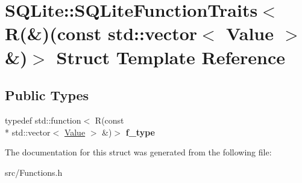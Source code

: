 \hypertarget{struct_s_q_lite_1_1_s_q_lite_function_traits_3_01_r_07_6_08_07const_01std_1_1vector_3_01_value_01_4_01_6_08_4}{\section{S\-Q\-Lite\-:\-:S\-Q\-Lite\-Function\-Traits$<$ R(\&)(const std\-:\-:vector$<$ Value $>$ \&)$>$ Struct Template Reference}
\label{struct_s_q_lite_1_1_s_q_lite_function_traits_3_01_r_07_6_08_07const_01std_1_1vector_3_01_value_01_4_01_6_08_4}
}
\subsection*{Public Types}
\begin{DoxyCompactItemize}
\item 
\hypertarget{struct_s_q_lite_1_1_s_q_lite_function_traits_3_01_r_07_6_08_07const_01std_1_1vector_3_01_value_01_4_01_6_08_4_a8687ea41557a72ddaf61ce3f076a5317}{typedef std\-::function$<$ R(const \\*
std\-::vector$<$ \hyperlink{class_s_q_lite_1_1_value}{Value} $>$ \&)$>$ {\bfseries f\-\_\-type}}\label{struct_s_q_lite_1_1_s_q_lite_function_traits_3_01_r_07_6_08_07const_01std_1_1vector_3_01_value_01_4_01_6_08_4_a8687ea41557a72ddaf61ce3f076a5317}

\end{DoxyCompactItemize}


The documentation for this struct was generated from the following file\-:\begin{DoxyCompactItemize}
\item 
src/Functions.\-h\end{DoxyCompactItemize}
